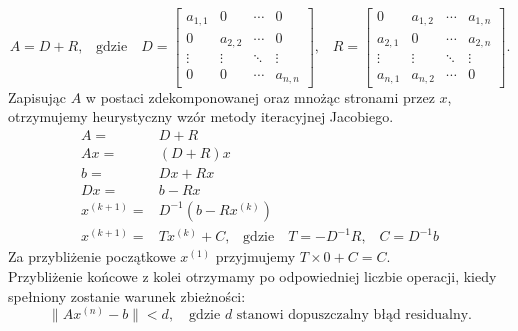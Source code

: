 \documentclass[a4paper,margin=1.54cm]{article}
\begin{document}
\[
A = D + R
\textrm{,} \quad \textrm{gdzie} \quad
D =
 \begin{bmatrix}
  a_{1,1} & 0 & \cdots & 0 \\
  0 & a_{2,2} & \cdots & 0 \\
  \vdots  & \vdots  & \ddots & \vdots  \\
  0 & 0 & \cdots & a_{n,n} 
 \end{bmatrix}
\textrm{,} \quad
R =
 \begin{bmatrix}
  0 & a_{1,2} & \cdots & a_{1,n} \\
  a_{2,1} & 0 & \cdots & a_{2,n} \\
  \vdots  & \vdots  & \ddots & \vdots  \\
  a_{n,1} & a_{n,2} & \cdots & 0
 \end{bmatrix}
\textrm{.}
\]
Zapisując $A$ w postaci zdekomponowanej oraz mnożąc stronami przez $x$, otrzymujemy heurystyczny wzór metody iteracyjnej Jacobiego.
\begin{align*}
A =& D + R\\
Ax =& (D + R)x\\
b =& Dx + Rx\\
Dx =& b - Rx\\
x^{(k+1)} =& D^{-1}(b-Rx^{(k)})\\
x^{(k+1)} =& Tx^{(k)}+C\textrm{,} \quad \textrm{gdzie} \quad T = -D^{-1}R \textrm{,} \quad C=D^{-1}b 
\end{align*}
Za przybliżenie początkowe $x^{(1)}$ przyjmujemy $T\times 0 + C = C$. \\
Przybliżenie końcowe z kolei otrzymamy po odpowiedniej liczbie operacji, kiedy spełniony zostanie warunek zbieżności:
\[
	\|Ax^{(n)} - b\| < d, \quad \textrm{gdzie } d \textrm{ stanowi dopuszczalny błąd residualny.}
\]

\newpage
\end{document}
